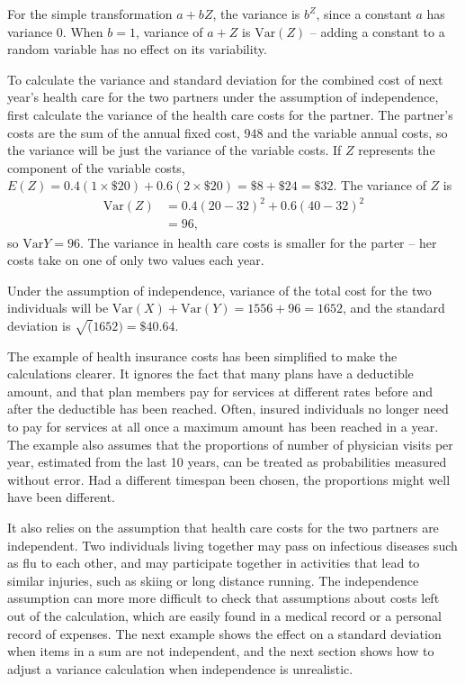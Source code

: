 For the simple transformation $a + bZ$, the variance is $b^Z$, since a constant $a$ has variance 0.  When $b = 1$, variance of $a + Z$ is $\text{Var}(Z)$ -- adding a constant to a random variable has no effect on its variability.

To calculate the variance and standard deviation for the combined cost of next year's health care for the two partners under the assumption of independence, first calculate the variance of the health care costs for the partner. The partner's costs are the sum of the annual fixed cost, $948$ and the variable annual costs, so the variance will be just the variance of the variable costs. If $Z$ represents the component of the variable costs, $E(Z) = 0.4(1 \times \$20) + 0.6(2 \times \$20) = \$8 + \$24 = \$32$.  The variance of $Z$ is
\begin{align*}
	\textrm{Var}(Z) &= 0.4(20 - 32)^2 + 0.6(40 - 32)^2 \\
	   &= 96,
\end{align*}
so $\text{Var}{Y} = 96$. The variance in health care costs is smaller for the parter -- her costs take on one of only two values each year.

Under the assumption of independence, variance of the total cost for the two individuals will be $\text{Var}(X) + \text{Var}(Y) = 1556 + 96 = 1652$, and the standard deviation is $\sqrt(1652) = \$40.64$.


The example of health insurance costs has been simplified to make the calculations clearer.  It ignores the fact that many plans have a deductible amount, and that plan members pay for services at different rates before and after the deductible has been reached. Often, insured individuals no longer need to pay for services at all once a maximum amount has been reached in a year. The example also assumes that the proportions of number of physician visits per year, estimated from the last 10 years, can be treated as probabilities measured without error. Had a different timespan been chosen, the proportions might well have been different.  

It also relies on the assumption that health care costs for the two partners are independent.  Two individuals living together may pass on infectious diseases such as flu to each other, and may participate together in activities that lead to similar injuries, such as skiing or long distance running.  The independence assumption can more more difficult to check that assumptions about costs left out of the calculation, which are easily found in a medical record or a personal record of expenses.  The next example shows the effect on a standard deviation when items in a sum are not independent, and the next section shows how to adjust a variance calculation when independence is unrealistic.

